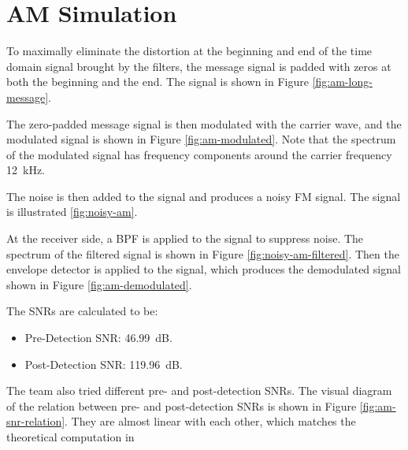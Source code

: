 \documentclass[../ECE459FinalProjectReport.tex]{subfiles}
\begin{document}
\section{AM Simulation}
To maximally eliminate the distortion at the beginning and end of the time domain signal brought by the filters, the message signal is padded with zeros at both the beginning and the end. The signal is shown in Figure \ref{fig:am-long-message}.

The zero-padded message signal is then modulated with the carrier wave, and the modulated signal is shown in Figure \ref{fig:am-modulated}. Note that the spectrum of the modulated signal has frequency components around the carrier frequency \SI{12}{kHz}.

The noise is then added to the signal and produces a noisy FM signal. The signal is illustrated \ref{fig:noisy-am}.

At the receiver side, a BPF is applied to the signal to suppress noise. The spectrum of the filtered signal is shown in Figure \ref{fig:noisy-am-filtered}. Then the envelope detector is applied to the signal, which produces the demodulated signal shown in Figure \ref{fig:am-demodulated}.

The SNRs are calculated to be:
\begin{itemize}
    \item Pre-Detection SNR: \SI{46.99}{dB}.
    \item Post-Detection SNR: \SI{119.96}{dB}.
\end{itemize}

The team also tried different pre- and post-detection SNRs. The visual diagram of the relation between pre- and post-detection SNRs is shown in Figure \ref{fig:am-snr-relation}. They are almost linear with each other, which matches the theoretical computation in \cite[Sec. 9.7]{haykinIntroductionAnalogDigital2007}
\end{document}
